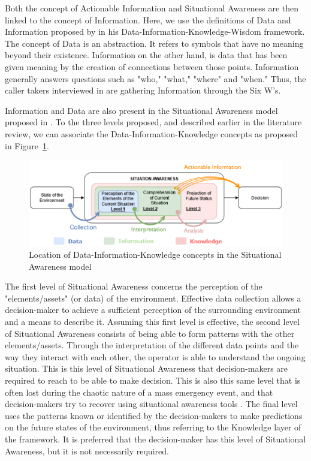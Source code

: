 Both the concept of Actionable Information and Situational Awareness are then linked to the concept of Information.
Here, we use the definitions of Data and Information proposed by \textcite{ackoffDataWisdom1989} in his Data-Information-Knowledge-Wisdom framework.
The concept of Data is an abstraction.
It refers to symbols that have no meaning beyond their existence.
Information on the other hand, is data that has been given meaning by the creation of connections between those points.
Information generally answers questions such as "who," "what," "where" and "when."
Thus, the caller takers interviewed in \textcite{kropczynskiIdentifyingActionableInformation2018} are gathering Information through the Six W's.

Information and Data are also present in the Situational Awareness model proposed in \textcite{endsleyTheorySituationAwareness1995}.
To the three levels proposed, and described earlier in the literature review, we can associate the Data-Information-Knowledge concepts as proposed in Figure~\ref{information:SA-DIK}.

\begin{figure}[htb]
    \centering
    \includegraphics[width=\textwidth]{figures/chap-3/Fig2-2.pdf}
    \caption{Location of Data-Information-Knowledge concepts in the Situational Awareness model}
    \label{information:SA-DIK}
\end{figure}

The first level of Situational Awareness concerns the perception of the "elements/assets" (or data) of the environment.
Effective data collection allows a decision-maker to achieve a sufficient perception of the surrounding environment and a means to describe it.
Assuming this first level is effective, the second level of Situational Awareness consists of being able to form patterns with the other elements/assets.
Through the interpretation of the different data points and the way they interact with each other, the operator is able to understand the ongoing situation.
This is this level of Situational Awareness that decision-makers are required to reach to be able to make decision.
This is also this same level that is often lost during the chaotic nature of a mass emergency event, and that decision-makers try to recover using situational awareness tools \parencite{endsleyTheorySituationAwareness1995}.
The final level uses the patterns known or identified by the decision-makers to make predictions on the future states of the environment, thus referring to the Knowledge layer of the framework.
It is preferred that the decision-maker has this level of Situational Awareness, but it is not necessarily required.

